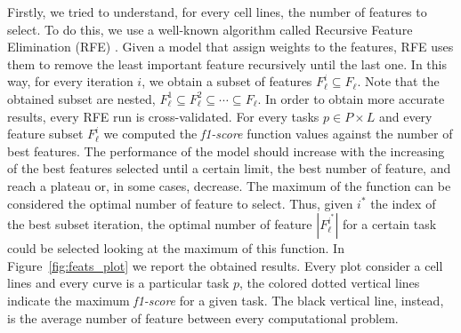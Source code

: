 Firstly, we tried to understand, for every cell lines, the number of features to select. To do this, we use a well-known algorithm called Recursive Feature Elimination (RFE) \cite{VapnikRFE}. Given a model that assign weights to the features, RFE uses them to remove the least important feature recursively until the last one. In this way, for every iteration $i$, we obtain a subset of features $F_{\ell}^{i} \subseteq F_\ell$. Note that the obtained subset are nested, $F_{\ell}^{1}  \subseteq  F_{\ell}^{2} \subseteq \cdots \subseteq F_{\ell}$. In order to obtain more accurate results, every RFE run is cross-validated. For every tasks $p \in P \times L$ and every feature subset $F_\ell^i$ we computed the \emph{f1-score} function values against the number of best features. The performance of the model should increase with the increasing of the best features selected until a certain limit, the best number of feature, and reach a plateau or, in some cases, decrease. The maximum of the function can be considered the optimal number of feature to select. Thus, given $i^{*}$ the index of the best subset iteration, the optimal number of feature $|F_\ell^{i^{*}}|$ for a certain task could be selected looking at the maximum of this function. In Figure~\ref{fig:feats_plot} we report the obtained results. Every plot consider a cell lines and every curve is a particular task $p$, the colored dotted vertical lines indicate the maximum \emph{f1-score} for a given task. The black vertical line, instead, is the average number of feature between every computational problem. 

